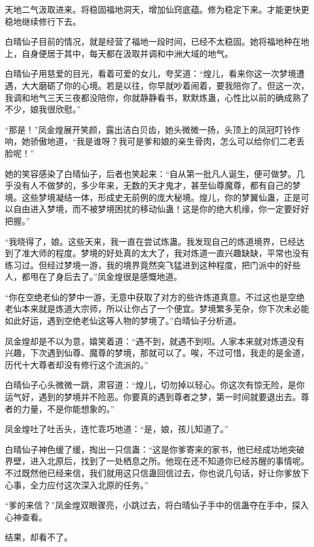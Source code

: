 \begin{this_body}
天地二气汲取进来。将稳固福地洞天，增加仙窍底蕴。修为稳定下来。才能更快更稳地继续修行下去。

白晴仙子目前的情况，就是经营了福地一段时间，已经不太稳固。她将福地种在地上，自身便居于其中，每天都在汲取并调和中洲大域的地气。

白晴仙子用慈爱的目光，看着可爱的女儿，夸奖道：“煌儿，看来你这一次梦境遭遇，大大磨砺了你的心境。若是以往，你早就吵着闹着，要我陪你了。但这一次，我调和地气三天三夜都没陪你，你就静静看书，默默炼蛊，心性比以前的确成熟了不少，娘我很欣慰。”

“那是！”凤金煌展开笑颜，露出洁白贝齿，她头微微一扬，头顶上的凤冠叮铃作响，她骄傲地道，“我是谁呀？我可是爹和娘的亲生骨肉，怎么可以给你们二老丢脸呢！”

她的笑容感染了白晴仙子，后者也笑起来：“自从第一批凡人诞生，便可做梦。几乎没有人不做梦的，多少年来，无数的天才鬼才，甚至仙尊魔尊，都有自己的梦境。这些梦境凝结一体，形成史无前例的庞大秘境。煌儿，你的梦翼仙蛊，正是可以自由进入梦境，而不被梦境困扰的移动仙蛊！这是你的绝大机缘，你一定要好好把握。”

“我晓得了，娘。这些天来，我一直在尝试炼蛊。我发现自己的炼道境界，已经达到了准大师的程度。梦境的好处真的太大了，我对炼道一直兴趣缺缺，平常也没有练习过。但经过梦境一游，我的境界竟然突飞猛进到这种程度，把门派中的好些人，都甩在了身后去了。”凤金煌很是感慨地道。

“你在空绝老仙的梦中一游，无意中获取了对方的些许炼道真意。不过这也是空绝老仙本来就是炼道大宗师，所以让你占了一个便宜。梦境繁多芜杂，你下次未必能如此好运，遇到空绝老仙这等人物的梦境了。”白晴仙子分析道。

凤金煌却是不以为意，嬉笑着道：“遇不到，就遇不到呗。人家本来就对炼道没有兴趣，下次遇到仙尊、魔尊的梦境，那就可以了。唉，不过可惜，我走的是金道，历代十大尊者却没有修行这个流派的。”

白晴仙子心头微微一跳，肃容道：“煌儿，切勿掉以轻心。你这次有惊无险，是你运气好，遇到的梦境并不险恶。你要真的遇到尊者之梦，第一时间就要退出去。尊者的力量，不是你能想象的。”

凤金煌吐了吐舌头，连忙乖巧地道：“是，娘，孩儿知道了。”

白晴仙子神色缓了缓，掏出一只信蛊：“这是你爹寄来的家书，他已经成功地突破界壁，进入北原后，找到了一处栖息之所。他现在还不知道你已经苏醒的事情呢。不过既然他已经来信，我们就用这只信蛊回信过去，你也说几句话，好让你爹放下心事，全力应付这次深入北原的任务。”

“爹的来信？”凤金煌双眼骤亮，小跳过去，将白晴仙子手中的信蛊夺在手中，探入心神查看。

结果，却看不了。


\end{this_body}

